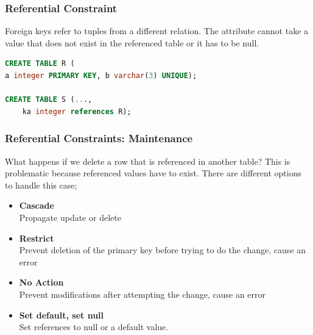 \subsubsection{Referential Constraint}
Foreign keys refer to tuples from a different relation. The attribute cannot take a value that does not exist in the referenced table or it has to be null.
\begin{lstlisting}[language=SQL]
CREATE TABLE R (
a integer PRIMARY KEY, b varchar(3) UNIQUE);

CREATE TABLE S (...,
	ka integer references R);
\end{lstlisting}

\subsubsection{Referential Constraints: Maintenance}
What happens if we delete a row that is referenced in another table? This is problematic because referenced values have to exist. There are different options to handle this case;
\begin{itemize}
\item \textbf{Cascade}\\
Propagate update or delete
\item \textbf{Restrict}\\
Prevent deletion of the primary key before trying to do the change, cause an error
\item \textbf{No Action}\\
Prevent modifications after attempting the change, cause an error
\item \textbf{Set default, set null}\\
Set references to null or a default value.
\end{itemize}
